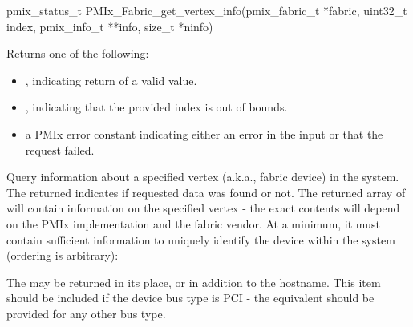 \format

\cspecificstart
\begin{codepar}
pmix_status_t
PMIx_Fabric_get_vertex_info(pmix_fabric_t *fabric, uint32_t index,
                            pmix_info_t **info, size_t *ninfo)
\end{codepar}
\cspecificend

\begin{arglist}
\end{arglist}

Returns one of the following:

\begin{itemize}
    \item {}, indicating return of a valid value.
    \item {}, indicating that the provided index is out of bounds.
    \item a \ac{PMIx} error constant indicating either an error in the input or that the request failed.
\end{itemize}

\descr

Query information about a specified vertex (a.k.a., fabric device) in the system. The returned  indicates if requested data was found or not. The returned array of  will contain information on the specified vertex - the exact contents will depend on the \ac{PMIx} implementation and the fabric vendor. At a minimum, it must contain sufficient information to uniquely identify the device within the system (ordering is arbitrary):

\reqattrstart
{} The  may be returned in its place, or in addition to the hostname.
\pasteAttributeItemEnd
{}
 This item should be included if the device bus type is \ac{PCI} - the equivalent should be provided for any other bus type.
\pasteAttributeItemEnd

